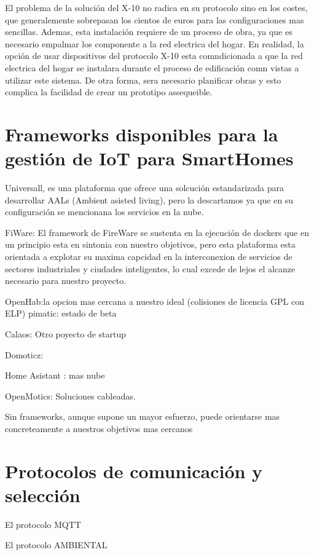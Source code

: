 El problema de la solución del X-10 no radica en su protocolo sino en los costes, que generalemente sobrepasan los cientos de euros para las configuraciones mas sencillas. Ademas, esta instalación requiere de un proceso de obra, ya que es necesario empalmar los componente a la red electrica del hogar. En realidad, la opción de usar dispositivos del protocolo X-10 esta comndicionada a que la red electrica del hogar se instalara durante el proceso de edificación comn vistas a utilizar este sistema. De otra forma, sera necesario planificar obras y esto complica la facilidad de crear un prototipo assequeible.



\section{Frameworks disponibles para la gestión de IoT para SmartHomes}
\label{ch:Capitulo2.1}

Universall, es una plataforma que ofrece una solcución estandarizada para desarrollar AALs (Ambient asisted living), pero la descartamos ya que en su configuración se mencionana los servicios en la nube.

FiWare: El framework de FireWare se sustenta en la ejecución de dockers que en un principio esta en sintonia con nuestro objetivos, pero esta plataforma esta orientada a explotar su maxima capcidad en la interconexion de servicios de sectores industriales y ciudades inteligentes, lo cual excede de lejos el alcanze necesario para nuestro proyecto.

OpenHab:la opcion mas cercana a nuestro ideal (colisiones de licencia GPL con ELP)
pimatic: estado de beta

Calaos: Otro poyecto de startup

Domoticz:

Home Asistant : mas nube

OpenMotics: Soluciones cableadas.

Sin frameworks, aunque supone un mayor esfuerzo, puede orientarse mas concreteamente a nuestros objetivos mas cercanos

\section{Protocolos de comunicación y selección}
\label{ch:Capitulo2.2}


El protocolo MQTT

El protocolo AMBIENTAL



